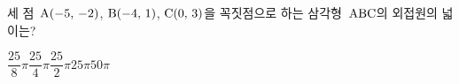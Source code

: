 세 점~$\mathrm{A}(-5,\,-2)$, $\mathrm{B}(-4,\,1)$, $\mathrm{C}(0,\,3)$을 꼭짓점으로 하는 삼각형~$\mathrm{ABC}$의 외접원의 넓이는?
\begin{choices32}{$\dfrac{25}{8}\pi$}{$\dfrac{25}{4}\pi$}{$\dfrac{25}{2}\pi$}{$25\pi$}{$50\pi$}\end{choices32}
